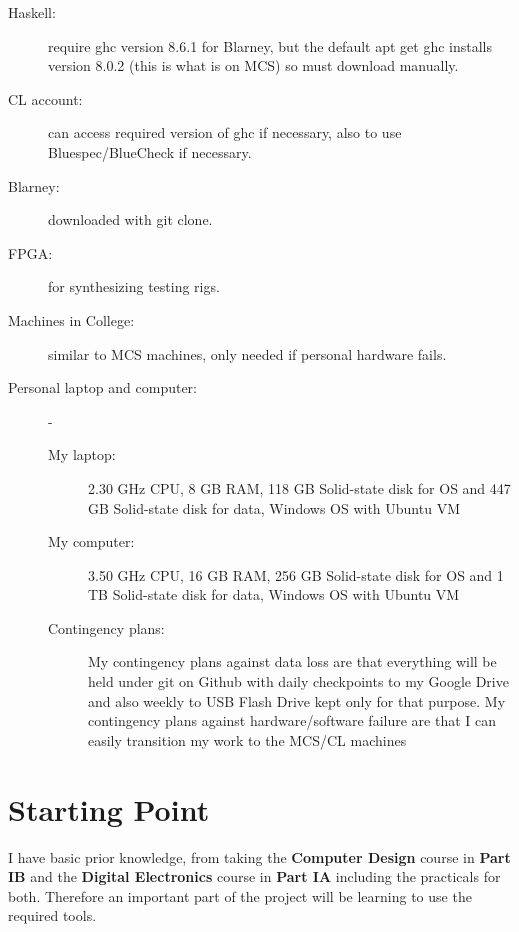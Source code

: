 \documentclass[UKenglish, 12pt]{article}
\begin{document}
\begin{description}

\item [Haskell:] require ghc version 8.6.1 for Blarney, but the default
apt get ghc installs version 8.0.2 (this is what is on MCS) so must
download manually.

\item [CL account:] can access required version of ghc if necessary, also to
use Bluespec/BlueCheck if necessary.

\item [Blarney:] downloaded with git clone.

\item [FPGA:] for synthesizing testing rigs.

\item [Machines in College:] similar to MCS machines, only needed if personal
hardware fails.

\item [Personal laptop and computer:]-

\begin{description}

\item [My laptop:] 2.30 GHz CPU, 8 GB RAM, 118 GB Solid-state disk for OS
and 447 GB Solid-state disk for data, Windows OS with Ubuntu VM

\item [My computer:] 3.50 GHz CPU, 16 GB RAM, 256 GB Solid-state disk for OS
and 1 TB Solid-state disk for data, Windows OS with Ubuntu VM

\item [Contingency plans:] My contingency plans against data loss are that everything
will be held under git on Github with daily checkpoints to
my Google Drive and also weekly to USB Flash Drive kept only for
that purpose.
My contingency plans against hardware/software failure are
that I can easily transition my work to the MCS/CL machines

\end{description}

\end{description}


\section*{Starting Point}

I have basic prior knowledge, from taking the \textbf{Computer Design} course in \textbf{Part IB} and the \textbf{Digital Electronics} course in \textbf{Part IA} including the practicals for both. Therefore an important part of the project will be learning to use the required tools.
\end{document}
